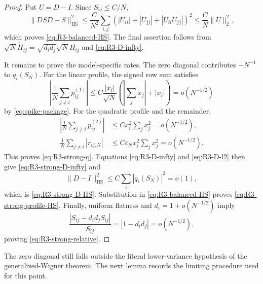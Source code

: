\documentclass[11pt]{article}
\theoremstyle{definition}
\theoremstyle{remark}
\newcommand{\HS}{\mathrm{HS}}
\newcommand{\norm}[1]{\lVert #1\rVert}
\begin{document}
\begin{proof}
Put \(U=D-I\).  Since \(S_{ij}\le C/N\),
\[
 \norm{DSD-S}_{\HS}^2
 \le \frac{C}{N^2}\sum_{i,j}
 (|U_{ii}|+|U_{jj}|+|U_{ii}U_{jj}|)^2
 \le \frac{C}{N}\norm U_2^2,
\]
which proves \eqref{eq:R3-balanced-HS}.  The final assertion follows from
\(\sqrt N\widetilde H_{ij}=\sqrt{d_id_j}\sqrt N H_{ij}\) and
\eqref{eq:R3-D-infty}.

It remains to prove the model-specific rates.  The zero diagonal contributes
$-N^{-1}$ to $q_i(S_N)$.  For the linear profile, the signed row sum satisfies
\[
 \left|\frac1N\sum_{j\ne i}p_{ij}^{(1)}\right|
 \leq C\frac{|x_i|}{\sqrt N}
 \left(\left|\sum_jx_j\right|+|x_i|\right)
 =o(N^{-1/2})
\]
by \eqref{eq:spike-package}.  For the quadratic profile and the remainder,
\begin{align*}
 \left|\frac1N\sum_{j\ne i}p_{ij}^{(2)}\right|
 &\leq Cx_i^2\sum_jx_j^2=o(N^{-1/2}),\\
 \frac1N\sum_{j\ne i}|r_{ij,N}|
 &\leq C\varepsilon_Nx_i^2\sum_jx_j^2=o(N^{-1/2}).
\end{align*}
This proves \eqref{eq:R3-strong-q}.  Equations
\eqref{eq:R3-D-infty} and \eqref{eq:R3-D-l2} then give
\eqref{eq:R3-strong-D-infty} and
\[
 \norm{D-I}_{\HS}^2
 \leq C\sum_i|q_i(S_N)|^2=o(1),
\]
which is \eqref{eq:R3-strong-D-HS}.  Substitution in
\eqref{eq:R3-balanced-HS} proves \eqref{eq:R3-strong-profile-HS}.
Finally, uniform flatness and $d_i=1+o(N^{-1/2})$ imply
\[
 \frac{|S_{ij}-d_id_jS_{ij}|}{S_{ij}}
 =|1-d_id_j|=o(N^{-1/2}),
\]
proving \eqref{eq:R3-strong-relative}.
\end{proof}

The zero diagonal still falls outside the literal lower-variance hypothesis
of the generalized-Wigner theorem.  The next lemma records the limiting
procedure used for this point.
\end{document}
